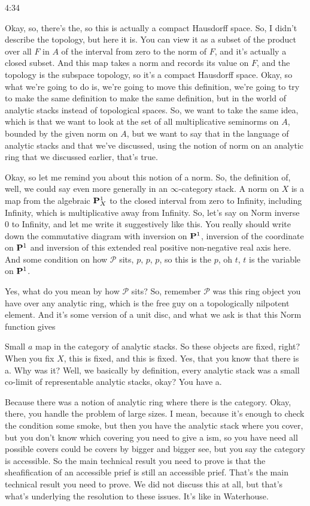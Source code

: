 \begin{unfinished}{4:34}
\begin{example}
Okay, so, there's the, so this is actually a compact Hausdorff space. So, I didn't describe the topology, but here it is. You can view it as a subset of the product over all $F$ in $A$ of the interval from zero to the norm of $F$, and it's actually a closed subset. And this map takes a norm and records its value on $F$, and the topology is the subspace topology, so it's a compact Hausdorff space.
Okay, so what we're going to do is, we're going to move this definition, we're going to try to make the same definition to make the same definition, but in the world of analytic stacks instead of topological spaces. So, we want to take the same idea, which is that we want to look at the set of all multiplicative seminorms on $A$, bounded by the given norm on $A$, but we want to say that in the language of analytic stacks and that we've discussed, using the notion of norm on an analytic ring that we discussed earlier, that's true.

Okay, so let me remind you about this notion of a norm. So, the definition of, well, we could say even more generally in an $\infty$-category stack. A norm on $X$ is a map from the algebraic $\P^1_X$ to the closed interval from zero to Infinity, including Infinity, which is multiplicative away from Infinity. So, let's say on Norm inverse $0$ to Infinity, and let me write it suggestively like this. You really should write down the commutative diagram with inversion on $\P^1$, inversion of the coordinate on $\P^1$ and inversion of this extended real positive non-negative real axis here. And some condition on how $\mathcal{P}$ sits, $p$, $p$, $p$, so this is the $p$, oh $t$, $t$ is the variable on $\P^1$.

Yes, what do you mean by how $\mathcal{P}$ sits? So, remember $\mathcal{P}$ was this ring object you have over any analytic ring, which is the free guy on a topologically nilpotent element. And it's some version of a unit disc, and what we ask is that this Norm function gives

Small $a$ map in the category of analytic stacks. So these objects are fixed, right? When you fix $X$, this is fixed, and this is fixed. Yes, that you know that there is a. Why was it? Well, we basically by definition, every analytic stack was a small co-limit of representable analytic stacks, okay? You have a.

Because there was a notion of analytic ring where there is the category. Okay, there, you handle the problem of large sizes. I mean, because it's enough to check the condition some smoke, but then you have the analytic stack where you cover, but you don't know which covering you need to give a ism, so you have need all possible covers could be covers by bigger and bigger see, but you say the category is accessible. So the main technical result you need to prove is that the sheafification of an accessible prief is still an accessible prief. That's the main technical result you need to prove. We did not discuss this at all, but that's what's underlying the resolution to these issues. It's like in Waterhouse.


\end{example}
\end{unfinished}
